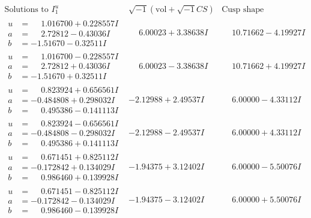 \documentclass[1p]{elsarticle_modified}
\theoremstyle{definition}
\newcommand{\I}{\sqrt{-1}}
\begin{document}
$$\begin{array}{c|c|c}  
\text{Solutions to }I^u_{1}& \I (\text{vol} + \sqrt{-1}CS) & \text{Cusp shape}\\
 \hline 
\begin{aligned}
u &= \phantom{-}1.016700 + 0.228557 I \\
a &= \phantom{-}2.72812 - 0.43036 I \\
b &= -1.51670 - 0.32511 I\end{aligned}
 & \phantom{-}6.00023 + 3.38638 I & \phantom{-}10.71662 - 4.19927 I \\ \hline\begin{aligned}
u &= \phantom{-}1.016700 - 0.228557 I \\
a &= \phantom{-}2.72812 + 0.43036 I \\
b &= -1.51670 + 0.32511 I\end{aligned}
 & \phantom{-}6.00023 - 3.38638 I & \phantom{-}10.71662 + 4.19927 I \\ \hline\begin{aligned}
u &= \phantom{-}0.823924 + 0.656561 I \\
a &= -0.484808 + 0.298032 I \\
b &= \phantom{-}0.495386 - 0.141113 I\end{aligned}
 & -2.12988 + 2.49537 I & \phantom{-}6.00000 - 4.33112 I \\ \hline\begin{aligned}
u &= \phantom{-}0.823924 - 0.656561 I \\
a &= -0.484808 - 0.298032 I \\
b &= \phantom{-}0.495386 + 0.141113 I\end{aligned}
 & -2.12988 - 2.49537 I & \phantom{-}6.00000 + 4.33112 I \\ \hline\begin{aligned}
u &= \phantom{-}0.671451 + 0.825112 I \\
a &= -0.172842 + 0.134029 I \\
b &= \phantom{-}0.986460 + 0.139928 I\end{aligned}
 & -1.94375 + 3.12402 I & \phantom{-}6.00000 - 5.50076 I \\ \hline\begin{aligned}
u &= \phantom{-}0.671451 - 0.825112 I \\
a &= -0.172842 - 0.134029 I \\
b &= \phantom{-}0.986460 - 0.139928 I\end{aligned}
 & -1.94375 - 3.12402 I & \phantom{-}6.00000 + 5.50076 I \\ \hline\begin{aligned}

\end{aligned}
\end{array}$$
\end{document}
